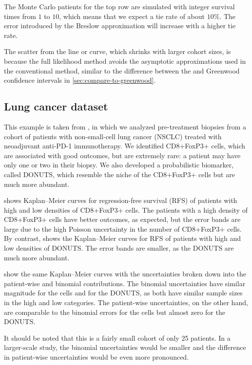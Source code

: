 \documentclass[article]{jss}
\newcommand{\KM}{Kaplan--Meier} %
\begin{document}
The Monte Carlo patients for the top row are simulated with integer survival times from \(1\) to \(10\), which means that we expect a tie rate of about \(10\%\). The error introduced by the Breslow approximation will increase with a higher tie rate.

The scatter from the line or curve, which shrinks with larger cohort sizes, is because the full likelihood method avoids the asymptotic approximations used in the conventional method, similar to the difference between the  and Greenwood confidence intervals in \cref{sec:compare-to-greenwood}.

\subsection{Lung cancer dataset}

This example is taken from \citet{DONUTS}, in which we analyzed pre-treatment biopsies from a cohort of patients with non-small-cell lung cancer (NSCLC) treated with neoadjuvant anti-PD-1 immunotherapy. We identified CD8+FoxP3+ cells, which are associated with good outcomes, but are extremely rare: a patient may have only one or two in their biopsy. We also developed a probabilistic biomarker, called DONUTS, which resemble the niche of the CD8+FoxP3+ cells but are much more abundant.

 shows \KM{} curves for regression-free survival (RFS) of patients with high and low densities of CD8+FoxP3+ cells. The patients with a high density of CD8+FoxP3+ cells have better outcomes, as expected, but the error bands are large due to the high Poisson uncertainty in the number of CD8+FoxP3+ cells. By contrast,  shows the \KM{} curves for RFS of patients with high and low densities of DONUTS\@. The error bands are smaller, as the DONUTS are much more abundant.

 show the same \KM{} curves with the uncertainties broken down into the patient-wise and binomial contributions. The binomial uncertainties have similar magnitude for the cells and for the DONUTS, as both have similar sample sizes in the high and low categories. The patient-wise uncertainties, on the other hand, are comparable to the binomial errors for the cells but almost zero for the DONUTS\@.

It should be noted that this is a fairly small cohort of only 25 patients. In a larger-scale study, the binomial uncertainties would be smaller and the difference in patient-wise uncertainties would be even more pronounced.
\end{document}
